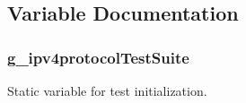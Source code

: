 \subsection{Variable Documentation}
\subsubsection[{\texorpdfstring{g\+\_\+ipv4protocol\+Test\+Suite}{g_ipv4protocolTestSuite}}]{ g\+\_\+ipv4protocol\+Test\+Suite\hspace{0.3cm}{\ttfamily [static]}}\hypertarget{ipv4-test_8cc_add9b9c9f2498275d0bd8cab061fc9aad}{}\label{ipv4-test_8cc_add9b9c9f2498275d0bd8cab061fc9aad}


Static variable for test initialization. 

